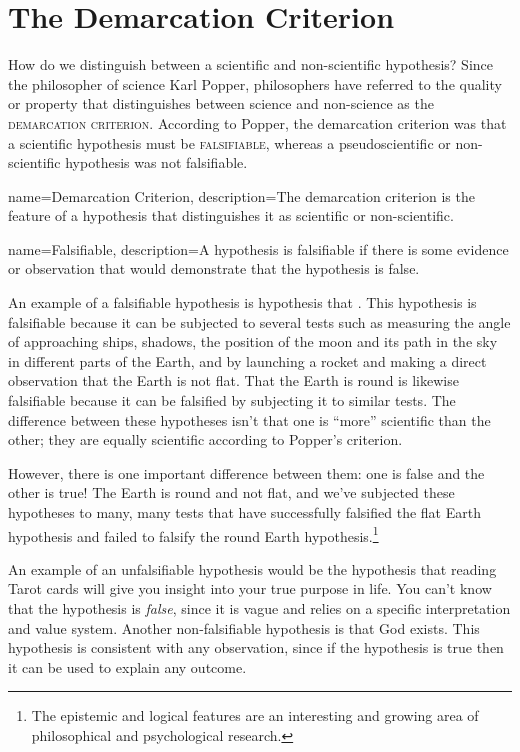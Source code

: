 \section{The Demarcation Criterion}

How do we distinguish between a scientific and non-scientific hypothesis? Since the philosopher of science Karl Popper, philosophers have referred to the quality or property that distinguishes between science and non-science as the \textsc{\gls{demarcation criterion}}. According to Popper, the demarcation criterion was that a scientific hypothesis must be \textsc{\gls{falsifiable}}, whereas a pseudoscientific or non-scientific hypothesis was not falsifiable.

{
name=Demarcation Criterion,
description={The demarcation criterion is the feature of a hypothesis that distinguishes it as scientific or non-scientific.}
}

{
name=Falsifiable,
description={A hypothesis is falsifiable if there is some evidence or observation that would demonstrate that the hypothesis is false.}
}

An example of a falsifiable hypothesis is hypothesis that . This hypothesis is falsifiable because it can be subjected to several tests such as measuring the angle of approaching ships, shadows, the position of the moon and its path in the sky in different parts of the Earth, and by launching a rocket and making a direct observation that the Earth is not flat. That the Earth is round is likewise falsifiable because it can be falsified by subjecting it to similar tests. The difference between these hypotheses isn't that one is ``more'' scientific than the other; they are equally scientific according to Popper's criterion.

However, there is one important difference between them: one is false and the other is true! The Earth is round and not flat, and we've subjected these hypotheses to many, many tests that have successfully falsified the flat Earth hypothesis and failed to falsify the round Earth hypothesis.\footnote{The epistemic and logical features are an interesting and growing area of philosophical and psychological research.}

An example of an unfalsifiable hypothesis would be the hypothesis that reading Tarot cards will give you insight into your true purpose in life. You can't know that the hypothesis is \emph{false}, since it is vague and relies on a specific interpretation and value system. Another non-falsifiable hypothesis is that God exists. This hypothesis is consistent with any observation, since if the hypothesis is true then it can be used to explain any outcome.

